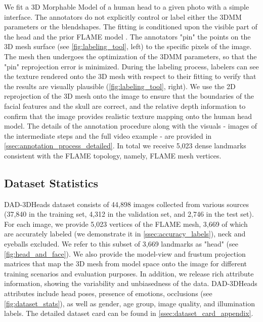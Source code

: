 \documentclass[10pt,twocolumn,letterpaper]{article}
\begin{document}
We fit a 3D Morphable Model of a human head to a given photo with a simple interface. 
The annotators do not explicitly control or label either the 3DMM parameters or the blendshapes.
The fitting is conditioned upon the visible part of the head and the prior FLAME model \cite{FLAME}.
The annotators "pin" the points on the 3D mesh surface (see \cref{fig:labeling_tool}, left) to the specific pixels of the image.
The mesh then undergoes the optimization of the 3DMM parameters, so that the "pin" reprojection error is minimized.
During the labeling process, labelers can see the texture rendered onto the 3D mesh with respect to their fitting to verify that the results are visually plausible (\cref{fig:labeling_tool}, right). 
We use the 2D reprojection of the 3D mesh onto the image to ensure that the boundaries of the facial features and the skull are correct, and the relative depth information to confirm that the image provides realistic texture mapping onto the human head model.
The details of the annotation procedure along with the visuals - images of the intermediate steps and the full video example - are provided in \cref{ssec:annotation_process_detailed}.
In total we receive 5,023 dense landmarks consistent with the FLAME topology, namely, FLAME mesh vertices. 




\subsection{Dataset Statistics}\label{ssec:data_statistics}

DAD-3DHeads dataset consists of 44,898 images collected from various sources (37,840 in the training set, 4,312 in the validation set, and 2,746 in the test set).
For each image, we provide 5,023 vertices of the FLAME mesh, 3,669 of which are accurately labeled (we demonstrate it in \cref{ssec:accuracy_labels}), neck and eyeballs excluded. 
We refer to this subset of 3,669 landmarks as "head" (see \cref{fig:head_and_face}).
We also provide the model-view and frustum projection matrices that map the 3D mesh from model space onto the image for different training scenarios and evaluation purposes. 
In addition, we release rich attribute information, showing the variability and unbiasedness of the data. 
DAD-3DHeads attributes include head poses, presence of emotions, occlusions (see \cref{fig:dataset_stats}), as well as gender, age group, image quality, and illumination labels. 
The detailed dataset card can be found in \cref{ssec:dataset_card_appendix}.
\end{document}
